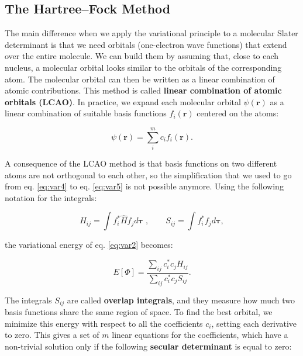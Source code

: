 \documentclass[
  english,
  9pt,
]{extbook}
\theoremstyle{definition}
\theoremstyle{definition}
\theoremstyle{definition}
\theoremstyle{definition}
\theoremstyle{remark}
\begin{document}
\subsection{The Hartree--Fock Method}\label{the-hartreefock-method}

The main difference when we apply the variational principle to a molecular Slater determinant is that we need orbitals (one-electron wave functions) that extend over the entire molecule. We can build them by assuming that, close to each nucleus, a molecular orbital looks similar to the orbitals of the corresponding atom. The molecular orbital can then be written as a linear combination of atomic contributions. This method is called \textbf{linear combination of atomic orbitals (LCAO)}. In practice, we expand each molecular orbital \(\psi(\mathbf{r})\) as a linear combination of suitable basis functions \(f_i(\mathbf{r})\) centered on the atoms:

\begin{equation}
\psi(\mathbf{r}) = \sum_i^m c_{i} f_i(\mathbf{r}).
\label{eq:molham10}
\end{equation}

A consequence of the LCAO method is that basis functions on two different atoms are not orthogonal to each other, so the simplification that we used to go from eq. \eqref{eq:var4} to eq. \eqref{eq:var5} is not possible anymore. Using the following notation for the integrals:

\begin{equation}
\displaystyle H_{ij} = \int f_i^* {\hat H} f_j d\mathbf{\tau}\;, \qquad \displaystyle S_{ij} = \int f_i^* f_j d\mathbf{\tau},
\label{eq:molham11}
\end{equation}

the variational energy of eq. \eqref{eq:var2} becomes:

\begin{equation}
E[\Phi] = \frac{\sum_{ij} c_i^* c_j H_{ij}}{\sum_{ij} c_i^* c_j S_{ij}}.
\label{eq:molham11b}
\end{equation}

The integrals \(S_{ij}\) are called \textbf{overlap integrals}, and they measure how much two basis functions share the same region of space. To find the best orbital, we minimize this energy with respect to all the coefficients \(c_i\), setting each derivative to zero. This gives a set of \(m\) linear equations for the coefficients, which have a non-trivial solution only if the following \textbf{secular determinant} is equal to zero:
\end{document}
